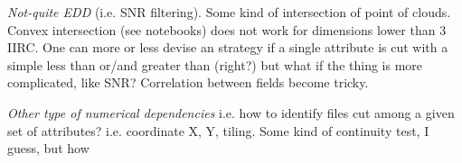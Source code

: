 \emph{Not-quite EDD} (i.e. SNR filtering). Some kind of intersection of point of clouds. Convex
    intersection (see notebooks) does not work for dimensions lower than 3 IIRC.
    One can more or less devise an strategy if a single attribute is cut with a simple
    less than or/and greater than (right?) but what if the thing is more complicated,
    like SNR? Correlation between fields become tricky.

\emph{Other type of numerical dependencies} i.e. how to identify files cut among a
    given set of attributes? i.e. coordinate X, Y, tiling. Some kind of continuity test, I guess,
    but how 